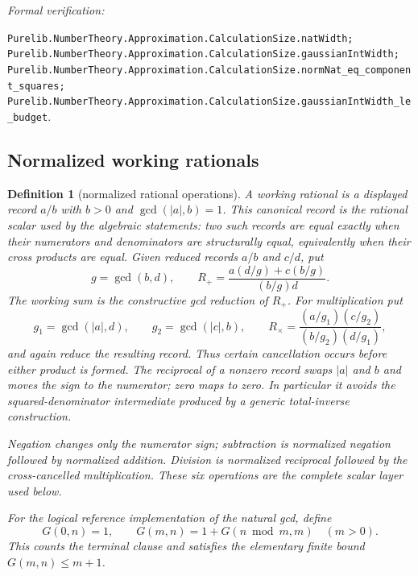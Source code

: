 \documentclass[11pt]{article}
\newtheorem{definition}[definition]{Definition}
\newcommand{\leanref}[1]{\par\smallskip\noindent
  \emph{Formal verification:}\par\nobreak
  {\raggedright\nolinkurl{#1}.\par}}
\begin{document}
\leanref{Purelib.NumberTheory.Approximation.CalculationSize.natWidth;
Purelib.NumberTheory.Approximation.CalculationSize.gaussianIntWidth;
Purelib.NumberTheory.Approximation.CalculationSize.normNat_eq_component_squares;
Purelib.NumberTheory.Approximation.CalculationSize.gaussianIntWidth_le_budget}

\subsection{Normalized working rationals}

\begin{definition}[normalized rational operations]
\label{def:normalized-rational-operations}
A working rational is a displayed record $a/b$ with $b>0$ and
$\gcd(|a|,b)=1$.  This canonical record is the rational scalar used by the
algebraic statements: two such records are equal exactly when their
numerators and denominators are structurally equal, equivalently when their
cross products are equal.  Given reduced records $a/b$ and $c/d$, put
\[
 g=\gcd(b,d),\qquad
 R_+=\frac{a(d/g)+c(b/g)}{(b/g)d}.
\]
The working sum is the constructive gcd reduction of $R_+$.  For
multiplication put
\[
 g_1=\gcd(|a|,d),\qquad g_2=\gcd(|c|,b),\qquad
 R_\times=\frac{(a/g_1)(c/g_2)}{(b/g_2)(d/g_1)},
\]
and again reduce the resulting record.  Thus certain cancellation occurs
before either product is formed.  The reciprocal of a nonzero record swaps
$|a|$ and $b$ and moves the sign to the numerator; zero maps to zero.  In
particular it avoids the squared-denominator intermediate produced by a
generic total-inverse construction.

Negation changes only the numerator sign; subtraction is normalized
negation followed by normalized addition.  Division is normalized reciprocal
followed by the cross-cancelled multiplication.  These six operations are
the complete scalar layer used below.

For the logical reference implementation of the natural gcd, define
\[
 G(0,n)=1,\qquad G(m,n)=1+G(n\bmod m,m)\quad(m>0).
\]
This counts the terminal clause and satisfies the elementary finite bound
$G(m,n)\le m+1$.
\end{definition}
\end{document}
